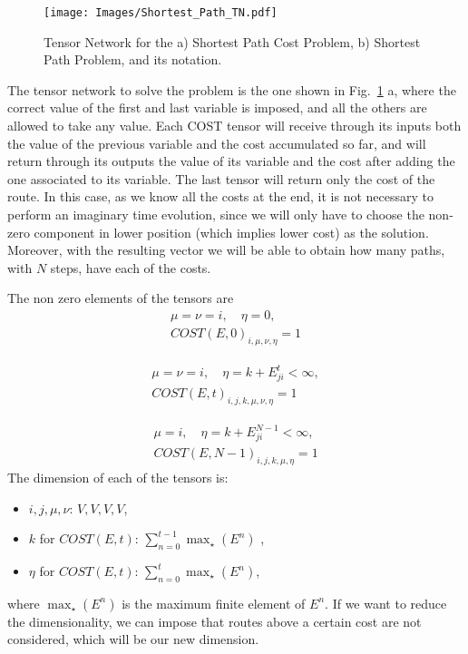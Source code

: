 \begin{figure}[h]
    \centering
    \texttt{[image: Images/Shortest\_Path\_TN.pdf]}
    \caption{Tensor Network for the a) Shortest Path Cost Problem, b) Shortest Path Problem, and its notation.}
    \label{fig: Shortest Path}
\end{figure}
The tensor network to solve the problem is the one shown in Fig.~\ref{fig: Shortest Path} a, where the correct value of the first and last variable is imposed, and all the others are allowed to take any value. Each COST tensor will receive through its inputs both the value of the previous variable and the cost accumulated so far, and will return through its outputs the value of its variable and the cost after adding the one associated to its variable. The last tensor will return only the cost of the route. In this case, as we know all the costs at the end, it is not necessary to perform an imaginary time evolution, since we will only have to choose the non-zero component in lower position (which implies lower cost) as the solution. Moreover, with the resulting vector we will be able to obtain how many paths, with $N$ steps, have each of the costs.

The non zero elements of the tensors are
\begin{equation}
     \begin{gathered}
         \mu=\nu=i,\quad \eta=0,\\
         COST(E,0)_{i,\mu,\nu,\eta} = 1
     \end{gathered}
\end{equation}

\begin{equation}
     \begin{gathered}
         \mu=\nu=i,\quad \eta=k+E^t_{ji}<\infty,\\
         COST(E,t)_{i,j,k,\mu,\nu,\eta} = 1%
     \end{gathered}
\end{equation}

\begin{equation}
     \begin{gathered}
         \mu=i,\quad \eta=k+E^{N-1}_{ji}<\infty,\\
         COST(E,N-1)_{i,j,k,\mu,\eta} = 1%
     \end{gathered}
\end{equation}
The dimension of each of the tensors is:
\begin{itemize}
    \item $i,j,\mu,\nu$: $V,V,V,V$,
    \item $k$ for $COST(E,t)$: $\sum_{n=0}^{t-1} \max_\star(E^n)$ ,
    \item $\eta$ for $COST(E,t)$: $\sum_{n=0}^{t} \max_\star(E^n)$,
\end{itemize}
where $\max_\star(E^n)$ is the maximum finite element of $E^n$. If we want to reduce the dimensionality, we can impose that routes above a certain cost are not considered, which will be our new dimension.

